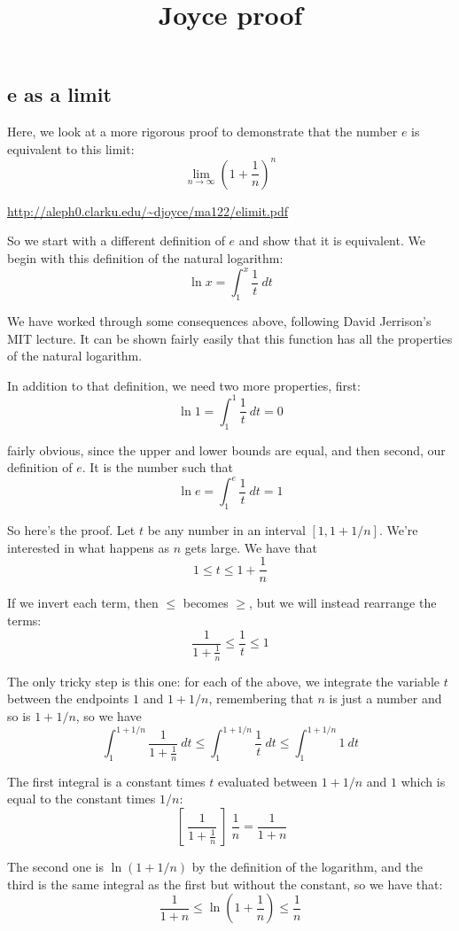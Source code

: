 \documentclass[11pt, oneside]{article}
\title{Joyce proof}
\date{}
\begin{document}
\maketitle
\Large

\subsection*{e as a limit}

Here, we look at a more rigorous proof to demonstrate that the number $e$ is equivalent to this limit:
\[ \lim_{n \rightarrow \infty} (1 + \frac{1}{n})^n \]

\url{http://aleph0.clarku.edu/~djoyce/ma122/elimit.pdf }

So we start with a different definition of $e$ and show that it is equivalent.  We begin with this definition of the natural logarithm:
\[ \ln x = \int_1^x \frac{1}{t} \ dt \]

We have worked through some consequences above, following David Jerrison's MIT lecture.  It can be shown fairly easily that this function has all the properties of the natural logarithm.

In addition to that definition, we need two more properties, first:
\[ \ln 1 = \int_1^1 \frac{1}{t} \ dt = 0 \]

fairly obvious, since the upper and lower bounds are equal, and then second, our definition of $e$.  It is the number such that
\[ \ln e = \int_1^e \frac{1}{t} \ dt = 1 \]

So here's the proof.  Let $t$ be any number in an interval $[1, 1 + 1/n]$.  We're interested in what happens as $n$ gets large.  We have that
\[ 1 \le t \le 1 + \frac{1}{n} \]

If we invert each term, then $\le$ becomes $\ge$, but we will instead rearrange the terms:
\[ \frac{1}{1 + \frac{1}{n}} \le \frac{1}{t} \le 1 \]

The only tricky step is this one:  for each of the above, we integrate the variable $t$ between the endpoints $1$ and $1 + 1/n$, remembering that $n$ is just a number and so is $1 + 1/n$, so we have
\[ \int_1^{1 + 1/n} \frac{1}{1 + \frac{1}{n}} \ dt \le \int_1^{1 + 1/n} \frac{1}{t} \ dt \le \int_1^{1 + 1/n}  1 \ dt \]

The first integral is a constant times $t$ evaluated between $1 + 1/n$ and $1$ which is equal to the constant times $1/n$:
\[ \ [ \ \frac{1}{1 + \frac{1}{n}} \ ] \  \frac{1}{n} = \frac{1}{1 + n} \]

The second one is $\ln (1 + 1/n)$ by the definition of the logarithm, and the third is the same integral as the first but without the constant, so we have that:
\[ \frac{1}{1 + n} \le \ln (1 + \frac{1}{n} ) \le \frac{1}{n} \]
\end{document}
